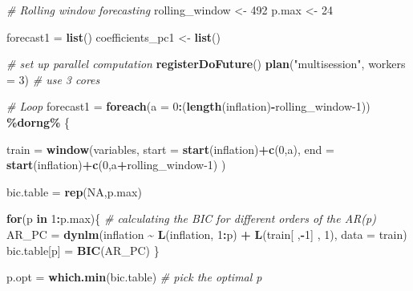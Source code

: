 \documentclass[
]{article}
\newenvironment{Shaded}{\begin{snugshade}}{\end{snugshade}}
\newcommand{\AttributeTok}[1]{\textcolor[rgb]{0.13,0.29,0.53}{#1}}
\newcommand{\CommentTok}[1]{\textcolor[rgb]{0.56,0.35,0.01}{\textit{#1}}}
\newcommand{\ConstantTok}[1]{\textcolor[rgb]{0.56,0.35,0.01}{#1}}
\newcommand{\ControlFlowTok}[1]{\textcolor[rgb]{0.13,0.29,0.53}{\textbf{#1}}}
\newcommand{\DecValTok}[1]{\textcolor[rgb]{0.00,0.00,0.81}{#1}}
\newcommand{\FunctionTok}[1]{\textcolor[rgb]{0.13,0.29,0.53}{\textbf{#1}}}
\newcommand{\NormalTok}[1]{#1}
\newcommand{\OtherTok}[1]{\textcolor[rgb]{0.56,0.35,0.01}{#1}}
\newcommand{\SpecialCharTok}[1]{\textcolor[rgb]{0.81,0.36,0.00}{\textbf{#1}}}
\newcommand{\StringTok}[1]{\textcolor[rgb]{0.31,0.60,0.02}{#1}}
\begin{document}
\begin{Shaded}
\begin{Highlighting}[]
\CommentTok{\# Rolling window forecasting}
\NormalTok{rolling\_window }\OtherTok{\textless{}{-}} \DecValTok{492}
\NormalTok{p.max }\OtherTok{\textless{}{-}} \DecValTok{24}

\NormalTok{forecast1 }\OtherTok{=} \FunctionTok{list}\NormalTok{()}
\NormalTok{coefficients\_pc1 }\OtherTok{\textless{}{-}} \FunctionTok{list}\NormalTok{()}

\CommentTok{\# set up parallel computation}
\FunctionTok{registerDoFuture}\NormalTok{()}
\FunctionTok{plan}\NormalTok{(}\StringTok{"multisession"}\NormalTok{, }\AttributeTok{workers =} \DecValTok{3}\NormalTok{) }\CommentTok{\# use 3 cores }

\CommentTok{\# Loop}
\NormalTok{forecast1 }\OtherTok{=} \FunctionTok{foreach}\NormalTok{(}\AttributeTok{a =} \DecValTok{0}\SpecialCharTok{:}\NormalTok{(}\FunctionTok{length}\NormalTok{(inflation)}\SpecialCharTok{{-}}\NormalTok{rolling\_window}\DecValTok{{-}1}\NormalTok{)) }\SpecialCharTok{\%dorng\%}\NormalTok{ \{ }

\NormalTok{train }\OtherTok{=} \FunctionTok{window}\NormalTok{(variables, }
               \AttributeTok{start =} \FunctionTok{start}\NormalTok{(inflation)}\SpecialCharTok{+}\FunctionTok{c}\NormalTok{(}\DecValTok{0}\NormalTok{,a), }
               \AttributeTok{end =} \FunctionTok{start}\NormalTok{(inflation)}\SpecialCharTok{+}\FunctionTok{c}\NormalTok{(}\DecValTok{0}\NormalTok{,a}\SpecialCharTok{+}\NormalTok{rolling\_window}\DecValTok{{-}1}\NormalTok{) )}

\NormalTok{bic.table }\OtherTok{=} \FunctionTok{rep}\NormalTok{(}\ConstantTok{NA}\NormalTok{,p.max)}

\ControlFlowTok{for}\NormalTok{(p }\ControlFlowTok{in} \DecValTok{1}\SpecialCharTok{:}\NormalTok{p.max)\{ }\CommentTok{\# calculating the BIC for different orders of the AR(p)}
\NormalTok{  AR\_PC }\OtherTok{=} \FunctionTok{dynlm}\NormalTok{(inflation }\SpecialCharTok{\textasciitilde{}} \FunctionTok{L}\NormalTok{(inflation, }\DecValTok{1}\SpecialCharTok{:}\NormalTok{p) }\SpecialCharTok{+} \FunctionTok{L}\NormalTok{(train[ ,}\SpecialCharTok{{-}}\DecValTok{1}\NormalTok{] , }\DecValTok{1}\NormalTok{), }
              \AttributeTok{data =}\NormalTok{ train)}
\NormalTok{  bic.table[p] }\OtherTok{=} \FunctionTok{BIC}\NormalTok{(AR\_PC)}
\NormalTok{\}}

\NormalTok{p.opt }\OtherTok{=} \FunctionTok{which.min}\NormalTok{(bic.table) }\CommentTok{\# pick the optimal p}


\end{Highlighting}
\end{Shaded}
\end{document}
